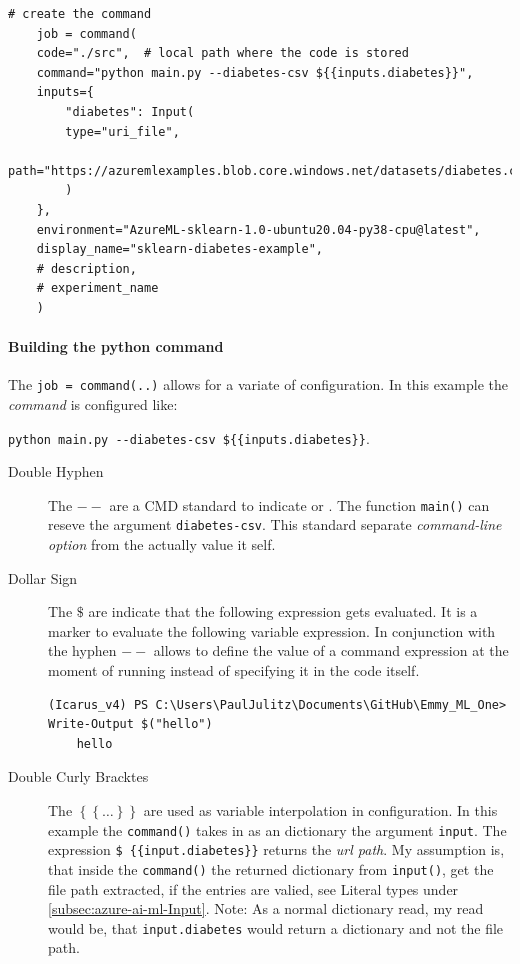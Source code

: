 \begin{lstlisting}[language=iPython, caption={Example command configuration},captionpos=b]
	# create the command
	job = command(
	code="./src",  # local path where the code is stored
	command="python main.py --diabetes-csv ${{inputs.diabetes}}",
	inputs={
		"diabetes": Input(
		type="uri_file",
		path="https://azuremlexamples.blob.core.windows.net/datasets/diabetes.csv",
		)
	},
	environment="AzureML-sklearn-1.0-ubuntu20.04-py38-cpu@latest",
	display_name="sklearn-diabetes-example",
	# description,
	# experiment_name
	)
\end{lstlisting}

\paragraph{Building the python command}
The \verb+job = command(..)+ allows for a variate of configuration. In this example the \textit{command} is configured like:

\begin{center}\verb+python main.py --diabetes-csv ${{inputs.diabetes}}+.\end{center}

\begin{description}
	\item[Double Hyphen] The $- -$ are a \gls{CMD} standard to indicate  or . The function \verb+main()+ can reseve the argument \verb+diabetes-csv+. This standard separate \textit{command-line option} from the actually value it self.
	\item[Dollar Sign] The $\$$ are indicate that the following expression gets evaluated. It is a marker to evaluate the following variable expression. In conjunction with the hyphen $--$ allows to define the value of a command expression at the moment of running instead of specifying it in the code itself. 
	\begin{lstlisting}[style=CMD]
	(Icarus_v4) PS C:\Users\PaulJulitz\Documents\GitHub\Emmy_ML_One> Write-Output $("hello")
	hello
	\end{lstlisting}
	\item[Double Curly Bracktes] The $\left\lbrace \left\lbrace \dots \right\rbrace\right\rbrace$ are used as variable interpolation in configuration. In this example the \verb+command()+ takes in as an dictionary the argument \verb+input+. The expression \verb+$ {{input.diabetes}}+ returns the \textit{url path}. My assumption is, that inside the \verb+command()+ the returned dictionary from \verb+input()+, get the file path extracted, if the entries are valied, see Literal types under \ref{subsec:azure-ai-ml-Input}. Note: As a normal dictionary read, my read would be, that \verb+input.diabetes+ would return a dictionary and not the file path.
\end{description} 

